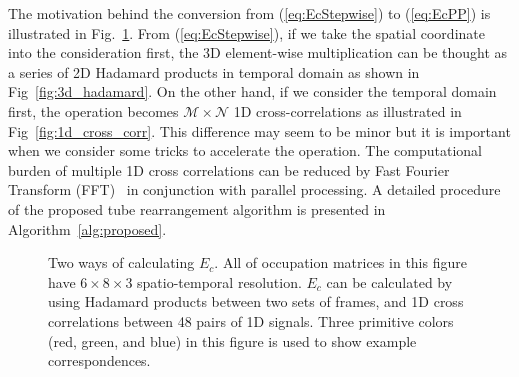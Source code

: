 \documentclass[11pt]{hyu_thesis}
\begin{document}
The motivation behind the conversion from (\ref{eq:EcStepwise}) to (\ref{eq:EcPP}) is illustrated in Fig.~\ref{fig:Ec_motivation}. From (\ref{eq:EcStepwise}), if we take the spatial coordinate into the consideration first, the 3D element-wise multiplication can be thought as a series of 2D Hadamard products in temporal domain as shown in Fig~\ref{fig:3d_hadamard}. On the other hand, if we consider the temporal domain first, the operation becomes $\mathcal{M} \times \mathcal{N}$ 1D cross-correlations as illustrated in Fig~\ref{fig:1d_cross_corr}. This difference may seem to be minor but it is important when we consider some tricks to accelerate the operation. The computational burden of multiple 1D cross correlations can be reduced by Fast Fourier Transform (FFT)~\cite{Oppenheim2009} in conjunction with parallel processing. A detailed procedure of the proposed tube rearrangement algorithm is presented in Algorithm~\ref{alg:proposed}.
\begin{figure}
	\centering
	\qquad
	\caption{Two ways of calculating $E_c$. All of occupation matrices in this figure have $6 \times 8 \times 3$ spatio-temporal resolution. $E_c$ can be calculated by using \protect{} Hadamard products between two sets of frames, and \protect{} 1D cross correlations between 48 pairs of 1D signals. Three primitive colors (red, green, and blue) in this figure is used to show example correspondences.}
	\label{fig:Ec_motivation}
\end{figure}
\end{document}

